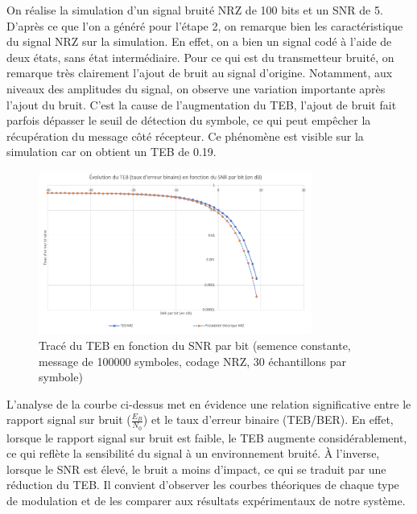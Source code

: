On réalise la simulation d'un signal bruité NRZ de 100 bits et un SNR de 5. D'après ce que l'on a généré pour l'étape 2, on remarque bien les caractéristique du signal NRZ sur la simulation. En effet, on a bien un signal codé à l'aide de deux états, sans état intermédiaire. Pour ce qui est du transmetteur bruité, on remarque très clairement l'ajout de bruit au signal d'origine. Notamment, aux niveaux des amplitudes du signal, on observe une variation importante après l'ajout du bruit. C'est la cause de l'augmentation du TEB, l'ajout de bruit fait parfois dépasser le seuil de détection du symbole, ce qui peut empêcher la récupération du message côté récepteur. Ce phénomène est visible sur la simulation car on obtient un TEB de 0.19.

\begin{figure}[H]
    \centering
    \includegraphics[width=0.8\textwidth]{img/etape3_teb_fct_snr.png}
    \caption{Tracé du TEB en fonction du SNR par bit (semence constante, message de 100000 symboles, codage NRZ, 30 échantillons par symbole)}
    \label{fig:etape3_teb_fct_snr}
\end{figure}

L'analyse de la courbe ci-dessus met en évidence une relation significative entre le rapport signal sur bruit ($\frac{E_B}{N_0}$) et le taux d'erreur binaire (TEB/BER). En effet, lorsque le rapport signal sur bruit est faible, le TEB augmente considérablement, ce qui reflète la sensibilité du signal à un environnement bruité. À l'inverse, lorsque le SNR est élevé, le bruit a moins d'impact, ce qui se traduit par une réduction du TEB. Il convient d'observer les courbes théoriques de chaque type de modulation et de les comparer aux résultats expérimentaux de notre système.

